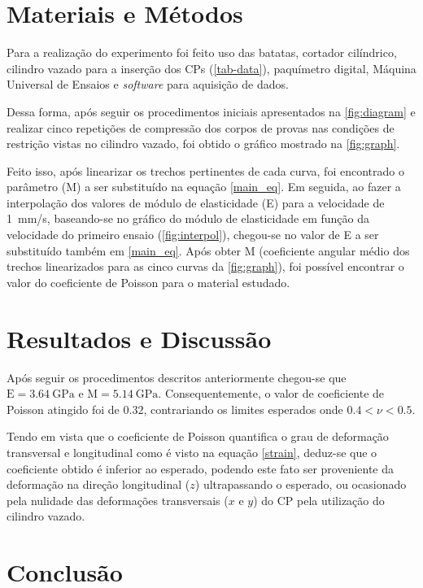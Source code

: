 \documentclass[a4paper, 12pt, brazilian]{article}
\begin{document}
	\section{Materiais e Métodos}
	
	Para a realização do experimento foi feito uso das batatas, cortador cilíndrico, cilindro vazado para a inserção dos CPs (\cref{tab-data}), paquímetro digital, Máquina Universal de Ensaios e \textit{software} para aquisição de dados. 
	
	Dessa forma, após seguir os procedimentos iniciais apresentados na  \cref{fig:diagram} e realizar cinco repetições de compressão dos corpos de provas nas condições de restrição vistas no cilindro vazado, foi obtido o gráfico mostrado na \cref{fig:graph}.
	
	Feito isso, após linearizar os trechos pertinentes de cada curva, foi encontrado o parâmetro (M) a ser substituído na equação \eqref{main_eq}. Em seguida, ao fazer a interpolação dos valores de módulo de elasticidade (E) para a velocidade de
	\SI{1}{\milli\meter/\second}, baseando-se no gráfico do módulo de elasticidade em função da velocidade do primeiro ensaio (\cref{fig:interpol}), chegou-se no valor de E a ser substituído também em \eqref{main_eq}. Após obter M (coeficiente angular médio dos trechos linearizados para as cinco curvas da \cref{fig:graph}), foi possível encontrar o valor do coeficiente de Poisson para o material estudado.
	
	\section{Resultados e Discussão}
	
	Após seguir os procedimentos descritos anteriormente chegou-se que  $\textrm{E}=\SI{3.64}{\giga\pascal}$ e $\textrm{M}=\SI{5.14}{\giga\pascal}$. Consequentemente, o valor de coeficiente de Poisson atingido foi de $0.32$, contrariando os limites esperados onde $0.4<\nu<0.5$. 
	
	Tendo em vista que o coeficiente de Poisson quantifica o grau de deformação transversal e longitudinal como é visto na equação \eqref{strain}, deduz-se que o coeficiente obtido é inferior ao esperado, podendo este fato ser proveniente da deformação na direção longitudinal ($z$) ultrapassando o esperado, ou ocasionado pela nulidade das deformações transversais ($x$ e $y$) do CP pela utilização do cilindro vazado.
	
	\section{Conclusão}
\end{document}
